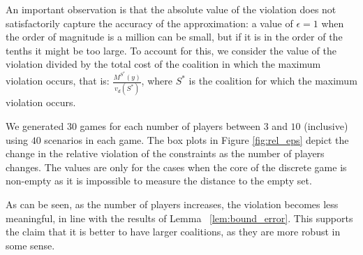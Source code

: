 An important observation is that the absolute value of the violation does not satisfactorily capture the accuracy of the approximation: a value of $\epsilon = 1$ when the order of magnitude is a million can be small, but if it is in the order of the tenths it might be too large. To account for this, we consider the value of the violation divided by the total cost of the coalition in which the maximum violation occurs, that is: $\frac{M^{S^*}(y)}{v_d(S^*)}$, where $S^*$ is the coalition for which the maximum violation occurs.

We generated $30$ games for each number of players between $3$ and $10$ (inclusive) using $40$ scenarios in each game.
The box plots in Figure \ref{fig:rel_eps} depict the change in the relative violation of the constraints as the number of players changes. The values are only for the cases when the core of the discrete game is non-empty as it is impossible to measure the distance to the empty set.

As can be seen, as the number of players increases, the violation becomes less meaningful, in line with the results of Lemma ~\ref{lem:bound_error}. This supports the claim that it is better to have larger coalitions, as they are more robust in some sense.

